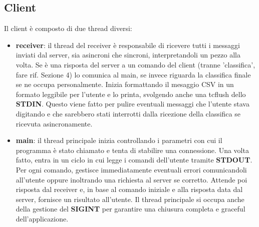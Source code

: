 \documentclass[a4paper]{article}
\begin{document}
        \subsection{Client}
        Il client è composto di due thread diversi:
        \begin{itemize}
        \item \textbf{receiver}: il thread del receiver è responsabile di ricevere tutti i messaggi inviati dal server, sia asincroni che sincroni, interpretandoli un pezzo alla volta. Se è una risposta del server a un comando del client (tranne 'classifica', fare rif. Sezione 4) lo comunica al main, se invece riguarda la classifica finale se ne occupa personalmente. Inizia formattando il mesaggio CSV in un formato leggibile per l'utente e lo printa, svolgendo anche una tcflush dello \textbf{STDIN}. Questo viene fatto per pulire eventuali messaggi che l'utente stava digitando e che sarebbero stati interrotti dalla ricezione della classifica se ricevuta asincronamente.
        \item \textbf{main}: il thread principale inizia controllando i parametri con cui il programma è stato chiamato e tenta di stabilire una connessione. Una volta fatto, entra in un ciclo in cui legge i comandi dell'utente tramite \textbf{STDOUT}. Per ogni comando, gestisce immediatamente eventuali errori comunicandoli all'utente oppure inoltrando una richiesta al server se corretto. Attende poi risposta dal receiver e, in base al comando iniziale e alla risposta data dal server, fornisce un risultato all'utente. Il thread principale si occupa anche della gestione del \textbf{SIGINT} per garantire una chiusura completa e graceful dell'applicazione.
        \end{itemize}
\end{document}

